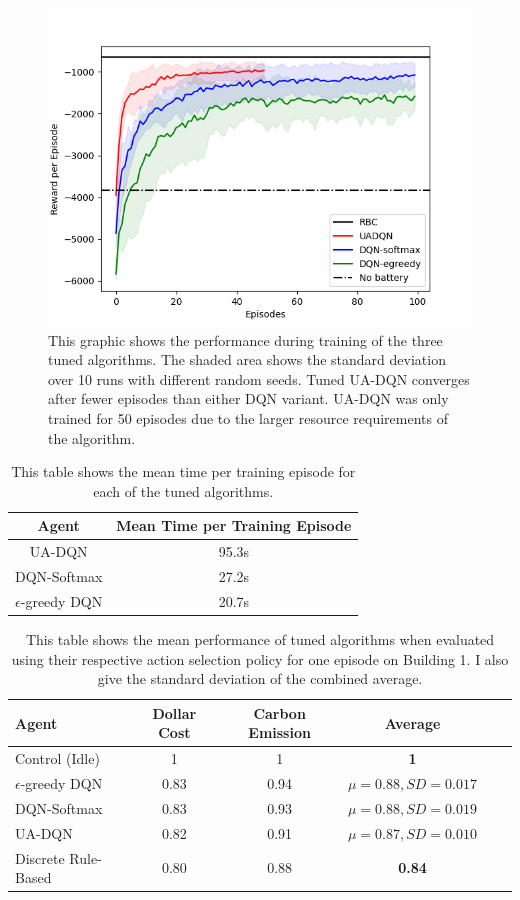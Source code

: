 \begin{figure}
  \centering
  \includegraphics[width=\figurewidth]{figures/tuning_validation.png}
  \caption{This graphic shows the performance during training of the three tuned algorithms. The shaded area shows the standard deviation over 10 runs with different random seeds. Tuned UA-DQN converges after fewer episodes than either DQN variant. UA-DQN was only trained for 50 episodes due to the larger resource requirements of the algorithm.}
  \label{fig:tuning_validation}
\end{figure}

\begin{table}
  \centering
  \caption{This table shows the mean time per training episode for each of the tuned algorithms.}
  \label{tab:resources}
  \begin{tabular}[pos]{c|c}
    Agent & Mean Time per Training Episode \\ \hline           
    UA-DQN   & 95.3s \\
    DQN-Softmax  &27.2s \\
    $\epsilon$-greedy DQN &20.7s \\
  \end{tabular}
\end{table}

\begin{table}
  \centering
  \caption{This table shows the mean performance of tuned algorithms when evaluated using their respective action selection policy for one episode on Building 1. I also give the standard deviation of the combined average.}
  \label{tab:tuned_results}
  \begin{tabular}{l|ccccc}
    Agent                 & Dollar Cost & Carbon Emission & Average \\ \hline
    Control (Idle)   & 1    & 1    & \textbf{1}    \\
    $\epsilon$-greedy DQN & 0.83 & 0.94 & $\mu = \mathbf{0.88}, SD = 0.017$ \\
    DQN-Softmax           & 0.83 & 0.93 & $\mu = \mathbf{0.88}, SD = 0.019$ \\
    UA-DQN                & 0.82 & 0.91 & $\mu = \mathbf{0.87}, SD = 0.010$ \\
    Discrete Rule-Based   & 0.80 & 0.88 & \textbf{0.84}
  \end{tabular}
\end{table}
